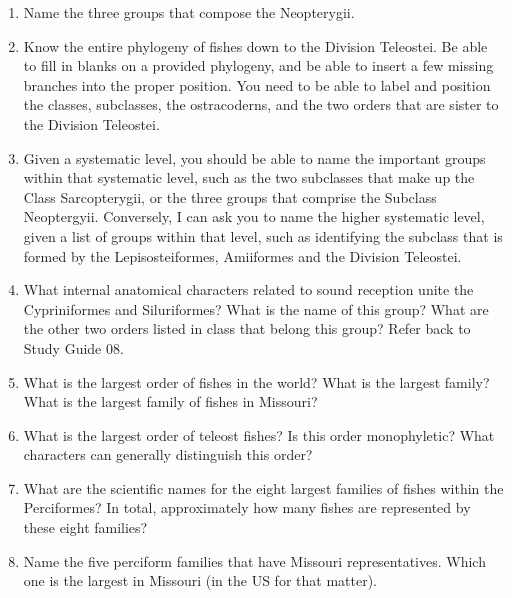 \documentclass[letterpaper]{tufte-handout}
\begin{document}
\begin{enumerate}
	\item Name the three groups that compose the Neopterygii.

	\item Know the entire phylogeny of fishes down to the Division Teleostei.  Be able to fill in blanks on a provided phylogeny, and be able to insert a few missing branches into the proper position.  You need to be able to label and position the classes, subclasses, the ostracoderns, and the two orders that are sister to the Division Teleostei.

	\item Given a systematic level, you should be able to name the important groups within that systematic level, such as the two subclasses that make up the Class Sarcopterygii, or the three groups that comprise the Subclass Neoptergyii.  Conversely, I can ask you to name the higher systematic level, given a list of groups within that level, such as identifying the subclass that is formed by the Lepisosteiformes, Amiiformes and the Division Teleostei.

	\item What internal anatomical characters related to sound reception unite the Cypriniformes and Siluriformes?  What is the name of this group?  What are the other two orders listed in class that belong this group? Refer back to Study Guide 08.

	\item What is the largest order of fishes in the world?  What is the largest family?  What is the largest family of fishes in Missouri?

	\item What is the largest order of teleost fishes?  Is this order monophyletic?  What characters can generally distinguish this order?

	\item What are the scientific names for the eight largest families of fishes within the Perciformes?  In total, approximately how many fishes are represented by these eight families?  

	\item Name the five perciform families that have Missouri representatives.  Which one is the largest in Missouri (in the US for that matter).

\end{enumerate}
\end{document}
